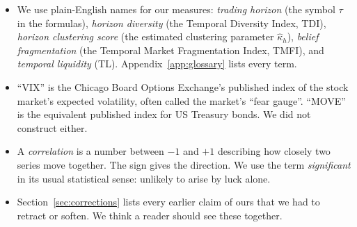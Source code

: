 \begin{itemize}[leftmargin=*]
\item We use plain-English names for our measures: \emph{trading horizon} (the symbol $\tau$ in the formulas), \emph{horizon diversity} (the Temporal Diversity Index, TDI), \emph{horizon clustering score} (the estimated clustering parameter $\hat\kappa_h$), \emph{belief fragmentation} (the Temporal Market Fragmentation Index, TMFI), and \emph{temporal liquidity} (TL). Appendix~\ref{app:glossary} lists every term.
\item ``VIX'' is the Chicago Board Options Exchange's published index of the stock market's expected volatility, often called the market's ``fear gauge''. ``MOVE'' is the equivalent published index for US Treasury bonds. We did not construct either.
\item A \emph{correlation} is a number between $-1$ and $+1$ describing how closely two series move together. The sign gives the direction. We use the term \emph{significant} in its usual statistical sense: unlikely to arise by luck alone.
\item Section~\ref{sec:corrections} lists every earlier claim of ours that we had to retract or soften. We think a reader should see these together.
\end{itemize}
